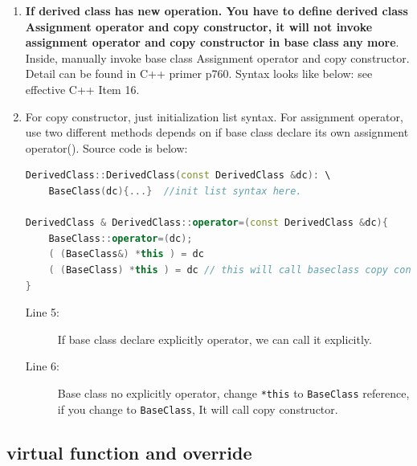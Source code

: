 \documentclass[a4paper,11pt,twoside]{book}
\begin{document}
\begin{itemize}
\begin{enumerate}
		\item \textbf{If derived class has new operation. You have to define derived class Assignment  operator and  copy constructor, it will not invoke assignment  operator and  copy constructor in base class any more}.  Inside, manually invoke base class Assignment operator and copy constructor. Detail can be found in C++ primer p760. Syntax looks like below: see effective C++ Item 16.
		
		\item For copy constructor, just initialization list syntax. For assignment operator, use two different methods depends on if base class declare its own assignment operator(). Source code is below:
		
\begin{lstlisting}[frame=single, language=c++]
DerivedClass::DerivedClass(const DerivedClass &dc): \
	BaseClass(dc){...}  //init list syntax here.
		
DerivedClass & DerivedClass::operator=(const DerivedClass &dc){
    BaseClass::operator=(dc);
    ( (BaseClass&) *this ) = dc
    ( (BaseClass) *this ) = dc // this will call baseclass copy constructor.
}
\end{lstlisting}

\begin{description}
	\item[Line 5:] If base class declare explicitly operator, we can call it explicitly.
	\item[Line 6:] Base class no explicitly operator, change \texttt{*this} to \texttt{BaseClass} reference, if you change to \texttt{BaseClass}, It will call copy constructor.
\end{description}
		
	\end{enumerate}


\end{itemize}

\subsection{virtual function and override}
\end{document}
